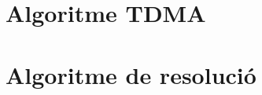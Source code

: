 \clearpage

\appendix

\section{Algoritme TDMA}
\vspace*{-5mm}


\section{Algoritme de resolució}
\vspace*{-5mm}



